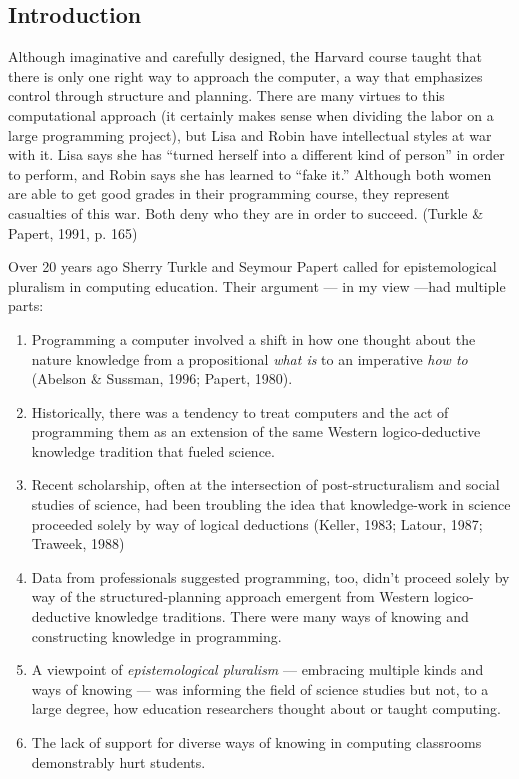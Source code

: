 \subsection{Introduction}\label{introduction-2}

Although imaginative and carefully designed, the Harvard course taught
that there is only one right way to approach the computer, a way that
emphasizes control through structure and planning. There are many
virtues to this computational approach (it certainly makes sense when
dividing the labor on a large programming project), but Lisa and Robin
have intellectual styles at war with it. Lisa says she has ``turned
herself into a different kind of person'' in order to perform, and Robin
says she has learned to ``fake it.'' Although both women are able to get
good grades in their programming course, they represent casualties of
this war. Both deny who they are in order to succeed. (Turkle \& Papert,
1991, p. 165)

Over 20 years ago Sherry Turkle and Seymour Papert called for
epistemological pluralism in computing education. Their argument --- in
my view ---had multiple parts:

\begin{enumerate}
\def\labelenumi{\arabic{enumi}.}
\item
  Programming a computer involved a shift in how one thought about the
  nature knowledge from a propositional \emph{what is} to an imperative
  \emph{how to} (Abelson \& Sussman, 1996; Papert, 1980).
\item
  Historically, there was a tendency to treat computers and the act of
  programming them as an extension of the same Western logico-deductive
  knowledge tradition that fueled science.
\item
  Recent scholarship, often at the intersection of post-structuralism
  and social studies of science, had been troubling the idea that
  knowledge-work in science proceeded solely by way of logical
  deductions (Keller, 1983; Latour, 1987; Traweek, 1988)
\item
  Data from professionals suggested programming, too, didn't proceed
  solely by way of the structured-planning approach emergent from
  Western logico-deductive knowledge traditions. There were many ways of
  knowing and constructing knowledge in programming.
\item
  A viewpoint of \emph{epistemological pluralism} --- embracing multiple
  kinds and ways of knowing --- was informing the field of science
  studies but not, to a large degree, how education researchers thought
  about or taught computing.
\item
  The lack of support for diverse ways of knowing in computing
  classrooms demonstrably hurt students.
\end{enumerate}

